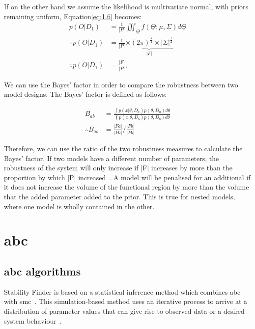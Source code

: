 If on the other hand we assume the likelihood is multivariate normal, with priors remaining uniform, Equation\ref{eq:1.6} becomes: 
\begin{align}
p(O|D_1) &= \frac{1}{|P|}\iiint_{\underline{\Theta}}f(\underline{\Theta};\mu,\Sigma)d\underline{\Theta} \\%
\therefore p(O|D_1) &= \frac{1}{|P|}\underbrace{\times(2\pi)^\frac{k}{2}\times |\Sigma|^\frac{1}{2}}_{|F|} \\
\therefore p(O|D_1) &= \frac{|F|}{|P|},
\end{align}

We can use the Bayes' factor in order to compare the robustness between two model designs. The Bayes' factor is defined as follows:

\begin{align}
B_{ab} &= \frac{\displaystyle \int p(x|\theta, D_a)p(\theta, D_a)d\theta}{\displaystyle \int p(x|\theta, D_b)p(\theta, D_b)d\theta} \\
\therefore B_{ab} &= \frac{|Fa|}{|Pa|} / \frac{|Fb|}{|Pb|} \label{eq:final_bayes}
\end{align}

\noindent Therefore, we can use the ratio of the two robustness measures to calculate the Bayes' factor. If two models have a different number of parameters, the robustness of the system will only increase if |F| increases by more than the proportion by which |P| increased~\autocite{Woods:2015vu}. A model will be penalised for an additional if it does not increase the volume of the functional region by more than the volume that the added parameter added to the prior. This is true for nested models, where one model is wholly contained in the other. 



\section{\acrfull{abc}}
\subsection{\acrshort{abc} algorithms}

Stability Finder is based on a statistical inference method which combines \acrshort{abc} with \acrfull{smc}~\autocite{Toni:2009tr}. This simulation-based method uses an iterative process to arrive at a distribution of parameter values that can give rise to observed data or a desired system behaviour~\autocite{Barnes:2011hh}.

